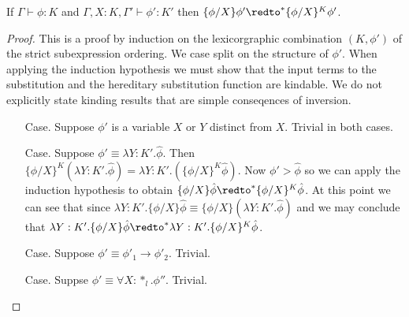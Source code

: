\begin{lemma}
  \label{lemma:soundness_reduction_tl_ssfw}
  If $\Gamma \vdash \phi : K$ and $\Gamma, X:K, \Gamma' \vdash \phi':K'$ then
  $\{\phi/X\}\phi' \redto^* \{\phi/X\}^K \phi'$.
\end{lemma}
\begin{proof}
  This is a proof by induction on the lexicorgraphic combination
  $(K, \phi')$ of the strict subexpression ordering.
  We case split on the structure of $\phi'$.  When applying
  the induction hypothesis we must show that the input terms to the
  substitution and the hereditary substitution function are kindable.
  We do not explicitly state kinding results that are simple
  conseqences of inversion.

  \begin{itemize}
  \item[Case.] Suppose $\phi'$ is a variable $X$ or $Y$ distinct from $X$.  
    Trivial in both cases.
  
  \item[Case.] Suppose $\phi' \equiv \lambda Y:K'.\hat{\phi}$.  Then
    $\{\phi/X\}^K (\lambda Y:K'.\hat{\phi}) = \lambda Y:K'.(\{\phi/X\}^K \hat{\phi})$. 
    Now $\phi' > \hat{\phi}$ so we can apply the induction hypothesis to obtain 
    $\{\phi/X\}\hat{\phi} \redto^* \{\phi/X\}^K \hat{\phi}$.  At this point we can see that since 
    $\lambda Y:K'.\{\phi/X\}\hat{\phi} \equiv \{\phi/X\}(\lambda Y:K'.\hat{\phi})$ and we may
    conclude that $\lambda Y:K'.\{\phi/X\}\hat{\phi} \redto^* \lambda Y:K'.\{\phi/X\}^K \hat{\phi}$.

  \item[Case.] Suppose $\phi' \equiv \phi'_1 \to \phi'_2$.  Trivial.
    
  \item[Case.] Suppse $\phi' \equiv \forall X:*_l.\phi''$.  Trivial.
    

\end{itemize}
\end{proof}
